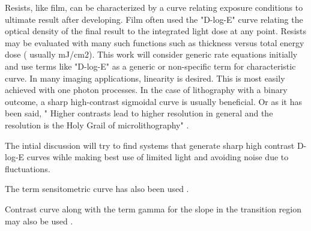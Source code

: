 Resists, like film, can be characterized by a curve relating exposure
conditions to ultimate result after developing. 
Film often used the "D-log-E" curve relating the optical density of the
final result to the integrated light dose at any point. Resists may 
be evaluated with many such functions such as thickness versus 
total energy dose ( usually mJ/cm2).  This work will consider generic
rate equations initially and use terms like "D-log-E" as a generic
or non-specific term for characteristic curve.  
In many imaging applications, linearity is desired. This is most easily achieved with one photon processes. In the case of lithography with a binary
outcome, a sharp high-contrast sigmoidal curve is usually beneficial. 
Or as it has been said, 
" Higher contrasts lead to
higher resolution in general and the resolution is the Holy Grail of microlithography" \cite{Ito_Chemical_Amplification_Resists_2005}.

The intial discussion will try to find systems that generate sharp
high contrast D-log-E curves wihle making best use of limited light
and avoiding noise due to fluctuations.

The term sensitometric curve has also been used \cite{Zhu_Yoo_Jursinic_Characteristics_sensitometric_curves_2003}.

Contrast curve along with the term gamma for the slope in the transition
region may also be used \cite{Ito_Chemical_Amplification_Resists_2005}.






\mjmtol{ }




















